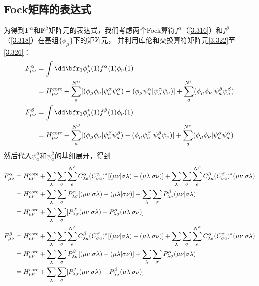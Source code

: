 \subsection{Fock矩阵的表达式}
为得到$\mathbf{F}^\alpha$和$\mathbf{F}^\beta$矩阵元的表达式，我们考虑两个Fock算符$f^\alpha$（\autoref{3.316}）和$f^\beta$（\autoref{3.318}）在基组$\{\phi_\mu\}$下的矩阵元，
并利用库伦和交换算符矩阵元\autoref{3.322}至\autoref{3.326}：
\begin{align}
	F^\alpha_{\mu\nu} &= \int{\dd\bfr_1}\phi^*_\mu(1)f^\alpha(1)\phi_\nu(1) \notag \\
	&=H^{\text{core}}_{\mu\nu}+\sum^{N^\alpha}_a[(\phi_\mu\phi_\nu|\psi^\alpha_a\psi^\alpha_a)-(\phi_\mu\psi^\alpha_a|\psi^\alpha_a\psi_\nu)]+\sum^{N^\beta}_a(\phi_\mu\phi_\nu|\psi^\beta_a\psi^\beta_a) \label{3.346} \\
	F^\beta_{\mu\nu} &= \int{\dd\bfr_1}\phi^*_\mu(1)f^\beta(1)\phi_\nu(1) \notag \\
	&=H^{\text{core}}_{\mu\nu}+\sum^{N^\beta}_a[(\phi_\mu\phi_\nu|\psi^\beta_a\psi^\beta_a)-(\phi_\mu\psi^\beta_a|\psi^\beta_a\psi_\nu)]+\sum^{N^\alpha}_a(\phi_\mu\phi_\nu|\psi^\alpha_a\psi^\alpha_a) \label{3.347}
\end{align}
然后代入$\psi^\alpha_a$和$\psi^\beta_a$的基组展开，得到
\begin{align}
	F^\alpha_{\mu\nu} &=H^{\text{core}}_{\mu\nu}+\sum_\lambda\sum_\sigma\sum^{N^\alpha}_a C^\alpha_{\lambda a}(C^\alpha_{\sigma a})^*[(\mu\nu|\sigma\lambda)-(\mu\lambda|\sigma\nu)]+\sum_\lambda\sum_\sigma\sum^{N^\beta}_a C^{\beta}_{\lambda a}(C^\beta_{\sigma a})^* (\mu\nu|\sigma\lambda) \notag \\
	&=H^{\text{core}}_{\mu\nu}+\sum_\lambda\sum_\sigma P^\alpha_{\lambda\sigma}[(\mu\nu|\sigma\lambda)-(\mu\lambda|\sigma\nu)]+\sum_\lambda\sum_\sigma P^\beta_{\lambda\sigma}(\mu\nu|\sigma\lambda) \notag \\
	&=H^{\text{core}}_{\mu\nu}+\sum_\lambda\sum_\sigma [P^T_{\lambda\sigma}(\mu\nu|\sigma\lambda)- P^\alpha_{\lambda\sigma}(\mu\lambda|\sigma\nu)] \label{3.348} \\
	F^\beta_{\mu\nu} &=H^{\text{core}}_{\mu\nu}+\sum_\lambda\sum_\sigma\sum^{N^\beta}_a  C^\beta_{\lambda a}(C^\beta_{\sigma a})^*[(\mu\nu|\sigma\lambda)-(\mu\lambda|\sigma\nu)]+\sum_\lambda\sum_\sigma\sum^{N^\alpha}_a C^{\alpha}_{\lambda a}(C^\alpha_{\sigma a})^* (\mu\nu|\sigma\lambda) \notag \\
	&=H^{\text{core}}_{\mu\nu}+\sum_\lambda\sum_\sigma P^\beta_{\lambda\sigma}[(\mu\nu|\sigma\lambda)-(\mu\lambda|\sigma\nu)]+\sum_\lambda\sum_\sigma P^\alpha_{\lambda\sigma}(\mu\nu|\sigma\lambda) \notag \\
	&=H^{\text{core}}_{\mu\nu}+\sum_\lambda\sum_\sigma [P^T_{\lambda\sigma}(\mu\nu|\sigma\lambda)- P^\beta_{\lambda\sigma}(\mu\lambda|\sigma\nu)] \label{3.349}
\end{align}
